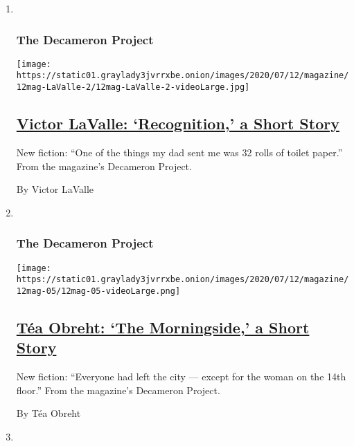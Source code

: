 \begin{enumerate}
\def\labelenumi{\arabic{enumi}.}
\item ~
  \hypertarget{the-decameron-project-3}{%
  \subsubsection{The Decameron Project}\label{the-decameron-project-3}}

  \texttt{[image: https://static01.graylady3jvrrxbe.onion/images/2020/07/12/magazine/12mag-LaValle-2/12mag-LaValle-2-videoLarge.jpg]}

  \hypertarget{victor-lavalle-recognition-a-short-story}{%
  \subsection{\texorpdfstring{\href{/interactive/2020/07/07/magazine/victor-lavalle-short-story.html}{Victor
  LaValle: `Recognition,' a Short
  Story}}{Victor LaValle: `Recognition,' a Short Story}}\label{victor-lavalle-recognition-a-short-story}}

  New fiction: ``One of the things my dad sent me was 32 rolls of toilet
  paper.'' From the magazine's Decameron Project.

  By Victor LaValle
\item ~
  \hypertarget{the-decameron-project-4}{%
  \subsubsection{The Decameron Project}\label{the-decameron-project-4}}

  \texttt{[image: https://static01.graylady3jvrrxbe.onion/images/2020/07/12/magazine/12mag-05/12mag-05-videoLarge.png]}

  \hypertarget{tuxe9a-obreht-the-morningside-a-short-story}{%
  \subsection{\texorpdfstring{\href{/interactive/2020/07/07/magazine/tea-obreht-short-story.html}{Téa
  Obreht: `The Morningside,' a Short
  Story}}{Téa Obreht: `The Morningside,' a Short Story}}\label{tuxe9a-obreht-the-morningside-a-short-story}}

  New fiction: ``Everyone had left the city --- except for the woman on
  the 14th floor.'' From the magazine's Decameron Project.

  By Téa Obreht
\item ~
  \hypertarget{the-decameron-project-5}{%
}
\end{enumerate}
